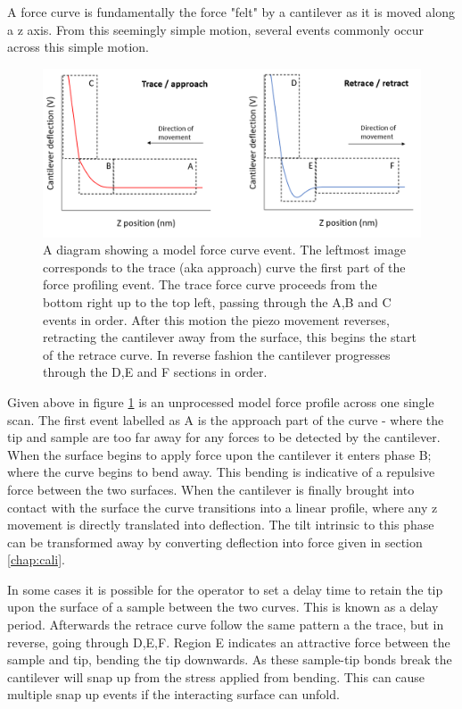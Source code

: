 A force curve is fundamentally the force "felt" by a cantilever as it is moved along a z axis. From this seemingly simple motion, several events commonly occur across this simple motion. 

\begin{figure}[h!]     %
        \begin{center}
          \includegraphics[width=140mm]{chapter2/forceCurveAnatomy.PNG}
\end{center}
\caption{A diagram showing a model force curve event. The leftmost image corresponds to the trace (aka approach) curve the first part of the force profiling event. The trace force curve proceeds from the bottom right up to the top left, passing through the A,B and C events in order. After this motion the piezo movement reverses, retracting the cantilever away from the surface, this begins the start of the retrace curve. In reverse fashion the cantilever progresses through the D,E and F sections in order.}
\label{fig:forceAnatomy}                 %
\end{figure}

Given above in figure \ref{fig:forceAnatomy} is an unprocessed model force profile across one single scan. The first event labelled as A is the approach part of the curve - where the tip and sample are too far away for any forces to be detected by the cantilever. When the surface begins to apply force upon the cantilever it enters phase B; where the curve begins to bend away. This bending is indicative of a repulsive force between the two surfaces. When the cantilever is finally brought into contact with the surface the curve transitions into a linear profile, where any z movement is directly translated into deflection. The tilt intrinsic to this phase can be transformed away by converting deflection into force given in section \ref{chap:cali}.

In some cases it is possible for the operator to set a delay time to retain the tip upon the surface of a sample between the two curves. This is known as a delay period. Afterwards the retrace curve follow the same pattern a the trace, but in reverse, going through D,E,F. Region E indicates an attractive force between the sample and tip, bending the tip downwards. As these sample-tip bonds break the cantilever will snap up from the stress applied from bending. This can cause multiple snap up events if the interacting surface can unfold.

